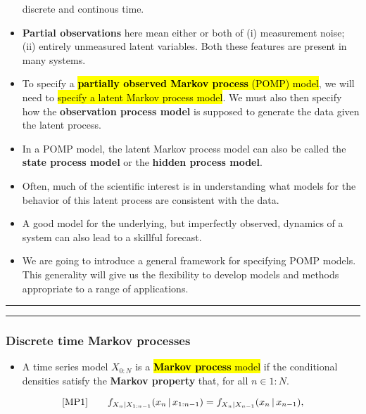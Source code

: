 \documentclass[]{article}
\providecommand{\tightlist}{%
  \setlength{\itemsep}{0pt}\setlength{\parskip}{0pt}}
\begin{document}
\begin{itemize}
  discrete and continous time.
\item
  \textbf{Partial observations} here mean either or both of (i)
  measurement noise; (ii) entirely unmeasured latent variables. Both
  these features are present in many systems.
\item
  To specify a \hl{\textbf{partially observed Markov process} (POMP) model},
  we will need to \hl{specify a latent Markov process model}. We must also
  then specify how the \textbf{observation process model} is supposed to
  generate the data given the latent process.
\item
  In a POMP model, the latent Markov process model can also be called
  the \textbf{state process model} or the \textbf{hidden process model}.
\item
  Often, much of the scientific interest is in understanding what models
  for the behavior of this latent process are consistent with the data.
\item
  A good model for the underlying, but imperfectly observed, dynamics of
  a system can also lead to a skillful forecast.
\item
  We are going to introduce a general framework for specifying POMP
  models. This generality will give us the flexibility to develop models
  and methods appropriate to a range of applications.
\end{itemize}

\begin{center}\rule{0.5\linewidth}{\linethickness}\end{center}

\begin{center}\rule{0.5\linewidth}{\linethickness}\end{center}

\subsubsection{Discrete time Markov
processes}\label{discrete-time-markov-processes}

\begin{itemize}
\tightlist
\item
  A time series model \(X_{0:N}\) is a \hl{\textbf{Markov process} model} if
  the conditional densities satisfy the \textbf{Markov property} that,
  for all \(n\in 1:N\).
\end{itemize}

$$\text{[MP1]}
\quad\quad f_{X_n|X_{1:n-1}}(x_n{\, | \,} x_{1:n-1}) = f_{X_n|X_{n-1}}(x_n{\, | \,} x_{n-1}),$$
\end{document}
